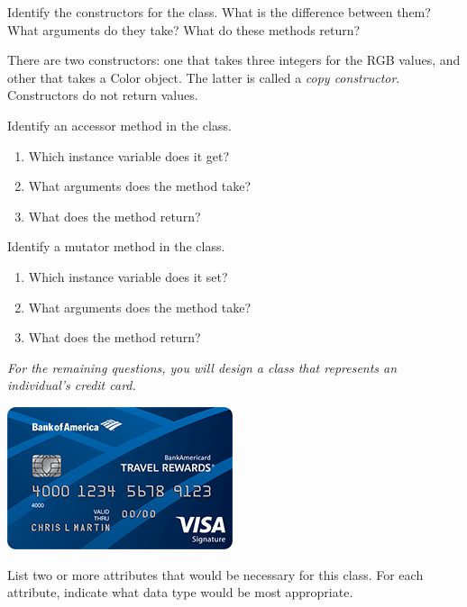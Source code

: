 

\Q Identify the constructors for the  class. What is the difference between them? What arguments do they take? What do these methods return?

\begin{answer}
There are two constructors: one that takes three integers for the RGB values, and other that takes a Color object. The latter is called a \emph{copy constructor}. Constructors do not return values.
\end{answer}


\Q Identify an accessor method in the  class. 
\begin{enumerate}[itemsep=1pt]
\item Which instance variable does it get? 
\item What arguments does the method take? 
\item What does the method return? 
\end{enumerate}


\Q Identify a mutator method in the  class.
\begin{enumerate}[itemsep=1pt]
\item Which instance variable does it set? 
\item What arguments does the method take? 
\item What does the method return? 
\end{enumerate}


\begin{center}
\textit{For the remaining questions, you will design a class that represents an individual's credit card.}
\bigskip\par
\includegraphics{credit-card.png}
\end{center}


\Q List two or more attributes that would be necessary for this  class. For each attribute, indicate what data type would be most appropriate.


